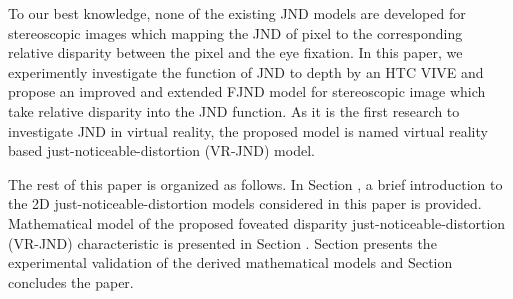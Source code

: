 \documentclass[journal]{IEEEtran}
\begin{document}
To our best knowledge, none of the existing JND models are developed for stereoscopic images which mapping the JND of pixel to the corresponding relative disparity between the pixel and the eye fixation. In this paper, we experimently investigate the function of JND to depth by an HTC VIVE and propose an improved and extended FJND model for stereoscopic image which take relative disparity into the JND function. As it is the first research to investigate JND in virtual reality, the proposed model is named virtual reality based just-noticeable-distortion (VR-JND) model.

The rest of this paper is organized as follows. In Section \uppercase\expandafter{}, a brief introduction to the 2D just-noticeable-distortion models considered in this paper is provided. Mathematical model of the proposed foveated disparity just-noticeable-distortion (VR-JND) characteristic is presented in Section \uppercase\expandafter{}. Section \uppercase\expandafter{} presents the experimental validation of the derived mathematical models and Section \uppercase\expandafter{} concludes the paper.
\end{document}
